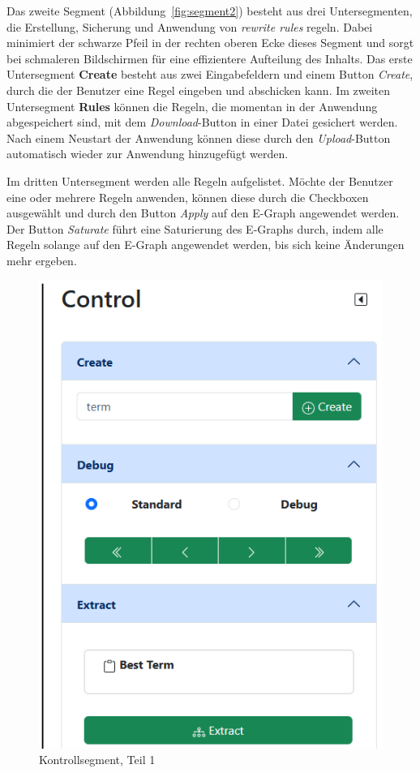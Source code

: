 Das zweite Segment (Abbildung~\ref{fig:segment2}) besteht aus drei Untersegmenten, die Erstellung, Sicherung und Anwendung von \textit{rewrite rules} regeln. 
Dabei minimiert der schwarze Pfeil in der rechten oberen Ecke dieses Segment und sorgt bei schmaleren Bildschirmen für eine effizientere Aufteilung des Inhalts.
Das erste Untersegment \textbf{Create} besteht aus zwei Eingabefeldern und einem Button \textit{Create}, durch die der Benutzer eine Regel eingeben und abschicken kann.
Im zweiten Untersegment \textbf{Rules} können die Regeln, die momentan in der Anwendung abgespeichert sind, mit dem \textit{Download}-Button in einer Datei gesichert werden. 
Nach einem Neustart der Anwendung können diese durch den \textit{Upload}-Button automatisch wieder zur Anwendung hinzugefügt werden. 

Im dritten Untersegment werden alle Regeln aufgelistet. Möchte der Benutzer eine oder mehrere Regeln anwenden, können diese durch die Checkboxen ausgewählt und durch den 
Button \textit{Apply} auf den E-Graph angewendet werden. Der Button \textit{Saturate} führt eine Saturierung des E-Graphs durch, indem alle Regeln solange auf den E-Graph angewendet werden, bis sich keine Änderungen mehr ergeben.

\begin{figure}
    \vspace{-10mm}
    \begin{center}
      \includegraphics[scale=0.6]{../fig/control1.png}
    \end{center}
    \caption{Kontrollsegment, Teil 1}
    \label{fig:segment31}
\end{figure}

